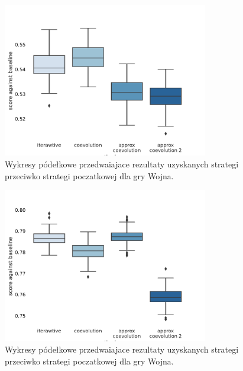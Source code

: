 \documentclass[inzynierska]{pwr_wmat_praca_dyplomowa}
\theoremstyle{plain}
\numberwithin{theorem}{chapter}
\theoremstyle{definition}
\numberwithin{theorem}{chapter}
\begin{document}
	\begin{figure}
		\centering
		\includegraphics[width=0.8\textwidth]{imagens/war_results.pdf}
		\caption{Wykresy pódełkowe przedwaiajace rezultaty uzyskanych strategi przeciwko strategi poczatkowej dla gry Wojna.}
		\label{fig:war_results}
	\end{figure}
	\begin{figure}
		\centering
		\includegraphics[width=0.8\textwidth]{imagens/rrrats_results.pdf}
		\caption{Wykresy pódełkowe przedwaiajace rezultaty uzyskanych strategi przeciwko strategi poczatkowej dla gry Wojna.}
		\label{fig:rrrats_results}
	\end{figure}
	
	


	\newpage
\end{document}
